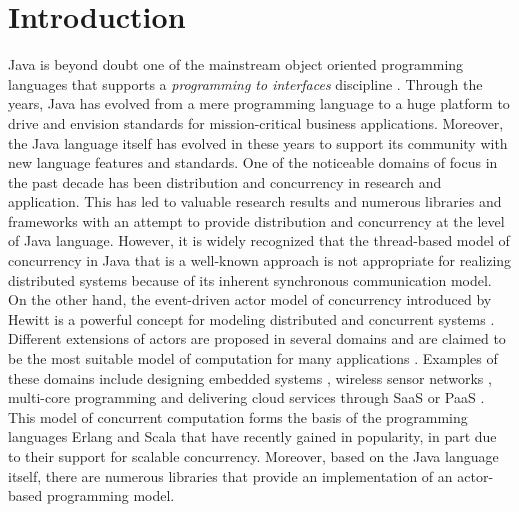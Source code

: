 \section{Introduction}
\label{ch03:sec:introduction}
Java is beyond doubt one of the mainstream object oriented programming languages 
that supports a \emph{programming to interfaces} discipline \cite{oop:patterns,oop:survey}.
Through the years, Java has evolved from a mere programming language to a huge platform to drive and envision standards for mission-critical business applications.
Moreover, the Java language itself has evolved in these years to support its community with new language features and standards.
One of the noticeable domains of focus in the past decade has been distribution and concurrency in research and application.
This has led to valuable research results and numerous libraries and frameworks with an attempt to provide distribution and concurrency at the level of Java language.
However, it is widely recognized that the thread-based model of concurrency in Java that is a well-known approach is not appropriate for realizing distributed systems because of its inherent synchronous communication model.
On the other hand, the event-driven actor model of concurrency introduced by Hewitt \cite{Hewitt69} is 
a powerful concept for modeling distributed and concurrent
systems \cite{Agha90,agha97}. 
Different extensions of actors are proposed in several domains and are claimed to be the most suitable model of computation for many  applications \cite{Hewitt07-commitment}. 
Examples of these domains include designing embedded systems \cite{LeeACtorEmbedded03,LeeLN09}, 
wireless sensor networks \cite{CheongSensor05}, multi-core programming \cite{KarmaniSA09} 
and delivering cloud services through SaaS or PaaS \cite{Chang:DAIS07}.
This model of concurrent computation forms the basis of the
programming languages Erlang \cite{Armstrong10Erlang} and Scala
\cite{haller09tcs} that have recently gained in popularity, in part
due to their support for scalable concurrency.  Moreover, based on the
Java language itself, there are numerous libraries  that
provide  an implementation of an actor-based programming model.  

